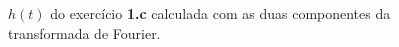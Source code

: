\begin{figure}
  \caption{\small{$h(t)$ do exercício \textbf{1.c} calculada com as duas componentes da transformada de Fourier.}}
  \label{fig:1c-hfs}
\end{figure}


